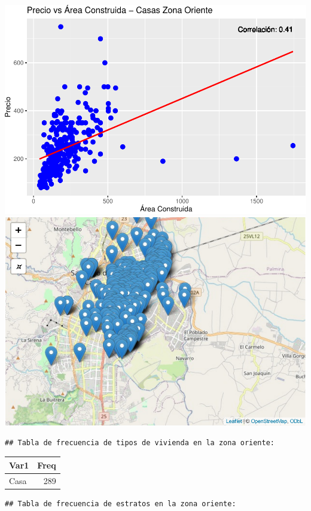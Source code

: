 \documentclass[
]{article}
\begin{document}
\includegraphics{A2_U2_InformeEjecutivo_files/figure-latex/unnamed-chunk-7-1.pdf}
\includegraphics{A2_U2_InformeEjecutivo_files/figure-latex/unnamed-chunk-7-2.pdf}

\begin{verbatim}
## Tabla de frecuencia de tipos de vivienda en la zona oriente:
\end{verbatim}

\begin{longtable}[]{@{}lr@{}}
\toprule\noalign{}
Var1 & Freq \\
\midrule\noalign{}
\endhead
\bottomrule\noalign{}
\endlastfoot
Casa & 289 \\
\end{longtable}

\begin{verbatim}
## Tabla de frecuencia de estratos en la zona oriente:
\end{verbatim}
\end{document}
